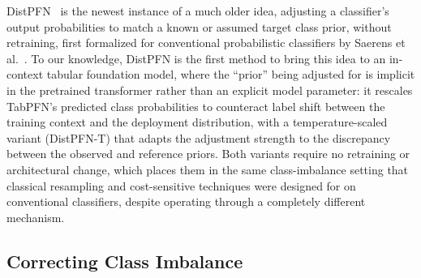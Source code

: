DistPFN~\cite{lee2026distpfn} is the newest instance of a much older idea,
adjusting a classifier's output probabilities to match a known or assumed
target class prior, without retraining, first formalized for conventional
probabilistic classifiers by Saerens et al.~\cite{saerens2002adjusting}. To
our knowledge, DistPFN is the first method to bring this idea to an
in-context tabular foundation model, where the ``prior'' being adjusted for
is implicit in the pretrained transformer rather than an explicit model
parameter: it rescales TabPFN's predicted class probabilities to counteract
label shift between the training context and the deployment distribution,
with a temperature-scaled variant (DistPFN-T) that adapts the adjustment
strength to the discrepancy between the observed and reference priors. Both
variants require no retraining or architectural change, which places them in
the same class-imbalance setting that classical resampling and
cost-sensitive techniques were designed for on conventional classifiers,
despite operating through a completely different mechanism.

\subsection{Correcting Class Imbalance}

